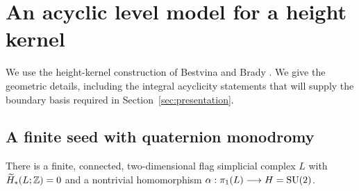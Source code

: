 \section{An acyclic level model for a height kernel}\label{sec:geometry}

We use the height-kernel construction of Bestvina and Brady
\cite{BB1997}.  We give the geometric details, including the integral
acyclicity statements that will supply the boundary basis required in
Section~\ref{sec:presentation}.

\subsection{A finite seed with quaternion monodromy}

\begin{lemma}\label{lem:geometric-seed}
There is a finite, connected, two-dimensional flag simplicial complex
$L$ with $\widetilde H_*(L;\mathbb Z)=0$ and a nontrivial homomorphism
$\alpha:\pi_1(L)\longrightarrow H=\operatorname{SU}(2)$.
\end{lemma}

